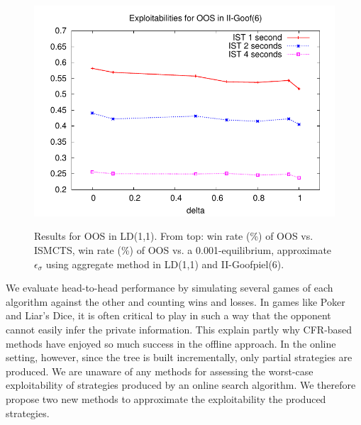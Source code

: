 \documentclass[letterpaper]{article}
\newcounter{mlNoteCounter}
\newcommand{\mlnote}[1]{{\scriptsize \color{darkgreen} $\blacksquare$ \refstepcounter{mlNoteCounter}\textsf{[ML]$_{\arabic{mlNoteCounter}}$:{#1}}}}
\begin{document}
\begin{figure}[t!]
\begin{center}
\includegraphics[scale=0.55]{plots/goof-expl} \\
\caption{Results for OOS in LD(1,1). From top: win rate (\%) of OOS vs. ISMCTS, win rate (\%) of 
OOS vs. a 0.001-equilibrium, approximate $\epsilon_{\sigma}$ using aggregate method in LD(1,1) 
and II-Goofpiel(6).  }
\label{fig:results}
\end{center}
\end{figure}


We evaluate head-to-head performance by simulating several games of each algorithm against the other
and counting wins and losses. 
In games like Poker and Liar's Dice, it is often critical to play in such a way that the opponent 
cannot easily infer the private information. This explain partly why CFR-based methods have 
enjoyed so much success in the offline approach. 
In the online setting, however, since the tree is built incrementally, only partial strategies
are produced. 
We are unaware of any methods for assessing the worst-case exploitability of strategies 
produced by an online search algorithm. 
We therefore propose two new methods to approximate the exploitability the produced strategies. 
\end{document}
